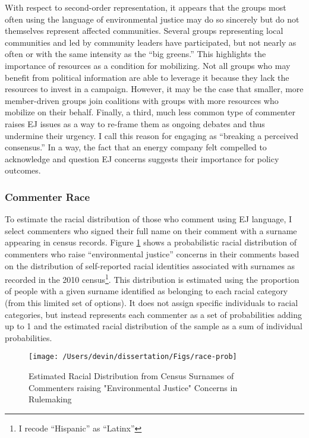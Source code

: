 \documentclass[
      12pt,
        ]{article}
\begin{document}
With respect to second-order representation, it appears that the groups
most often using the language of environmental justice may do so
sincerely but do not themselves represent affected communities. Several
groups representing local communities and led by community leaders have
participated, but not nearly as often or with the same intensity as the
``big greens.'' This highlights the importance of resources as a condition
for mobilizing. Not all groups who may benefit from political
information are able to leverage it because they lack the resources to
invest in a campaign. However, it may be the case that smaller, more
member-driven groups join coalitions with groups with more resources who
mobilize on their behalf.
Finally, a third, much less common type of commenter raises EJ issues
as a way to re-frame them as ongoing debates and thus undermine their
urgency. I call this reason for engaging as ``breaking a perceived
consensus.'' In a way, the fact that an energy company felt compelled to
acknowledge and question EJ concerns suggests their
importance for policy outcomes.

\hypertarget{commenter-race}{%
\subsubsection{Commenter Race}\label{commenter-race}}

To estimate the racial distribution of those who comment
using EJ language, I select commenters who
signed their full name on their comment with a
surname appearing in census records. Figure
\ref{fig:ejcommentsbyrace} shows a probabilistic racial
distribution of commenters who raise ``environmental justice'' concerns in
their comments based on the distribution of self-reported racial identities
associated with surnames as recorded in the 2010 census\footnote{I recode ``Hispanic'' as ``Latinx''}. This distribution is estimated using the proportion of
people with a given surname identified as belonging to each racial
category (from this limited set of options). It does not
assign specific individuals to racial categories, but instead represents each commenter as a set of probabilities adding up to 1 and the estimated racial distribution of the sample as a sum of individual probabilities.

\begin{figure}

{\centering \texttt{[image: /Users/devin/dissertation/Figs/race-prob]} 

}

\caption{Estimated Racial Distribution from Census Surnames of Commenters raising "Environmental Justice" Concerns in Rulemaking}\label{fig:ejcommentsbyrace}
\end{figure}
\end{document}

